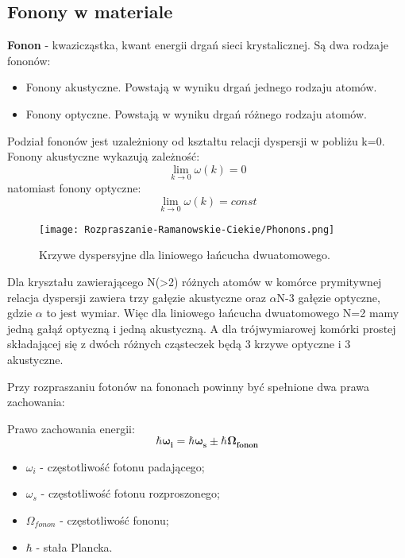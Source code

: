 \newpage

\subsection{Fonony w materiale}
\textbf{Fonon} -  kwazicząstka, kwant energii drgań sieci krystalicznej. Są dwa rodzaje fononów:
\begin{itemize}
	\item{Fonony akustyczne. Powstają w wyniku drgań jednego rodzaju atomów.}
	\item{Fonony optyczne. Powstają w wyniku drgań różnego rodzaju atomów.}
\end{itemize}
Podział fononów jest uzależniony od kształtu relacji dyspersji w pobliżu k=0. \\
Fonony akustyczne wykazują zależność:
\begin{equation}
	\lim_{k \to 0} \omega(k) = 0
\end{equation}
natomiast fonony optyczne:
\begin{equation}
\lim_{k \to 0} \omega(k) = const
\end{equation}
\begin{figure}[H]
	\begin{center}
		\texttt{[image: Rozpraszanie-Ramanowskie-Ciekie/Phonons.png]}
		\caption{Krzywe dyspersyjne dla liniowego łańcucha dwuatomowego.}
	\end{center}
\end{figure}
Dla kryształu zawierającego N(>2) różnych atomów w komórce prymitywnej relacja dyspersji zawiera trzy gałęzie akustyczne oraz $\alpha$N-3 gałęzie optyczne, gdzie $\alpha$ to jest wymiar. Więc dla liniowego łańcucha dwuatomowego N=2 mamy jedną gałąź optyczną i jedną akustyczną. A dla trójwymiarowej komórki prostej składającej się z dwóch różnych cząsteczek będą 3 krzywe optyczne i 3 akustyczne.

Przy rozpraszaniu fotonów na fononach powinny być spełnione dwa prawa zachowania: 

Prawo zachowania energii:
\begin{equation}
	\hbar \mathbf{\omega_{i}} = \hbar \mathbf{\omega_{s}} \pm \hbar \mathbf{\Omega_{fonon}}
\end{equation}
\begin{itemize}
	\item $\omega_{i}$ - częstotliwość fotonu padającego;
	\item $\omega_{s}$ - częstotliwość fotonu rozproszonego;
	\item $\Omega_{fonon}$ - częstotliwość fononu;
	\item $\hbar$ - stała Plancka.
\end{itemize}


